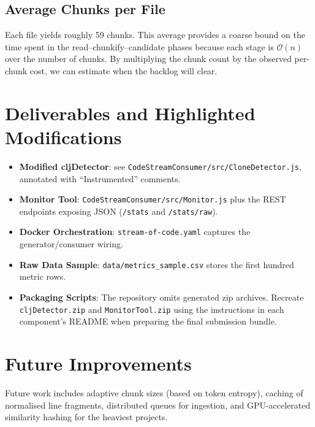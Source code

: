 \documentclass[11pt,a4paper]{article}
\begin{document}
\subsection{Average Chunks per File}
Each file yields roughly 59 chunks. This average provides a coarse bound on the time spent in the
read--chunkify--candidate phases because each stage is \(\mathcal{O}(n)\) over the number of chunks.
By multiplying the chunk count by the observed per-chunk cost, we can estimate when the backlog will
clear.

\section{Deliverables and Highlighted Modifications}
\label{sec:artefacts}
\begin{itemize}
  \item \textbf{Modified cljDetector}: see \texttt{CodeStreamConsumer/src/CloneDetector.js}, annotated
        with ``Instrumented'' comments.
  \item \textbf{Monitor Tool}: \texttt{CodeStreamConsumer/src/Monitor.js} plus the REST endpoints
        exposing JSON ({\small\texttt{/stats}} and {\small\texttt{/stats/raw}}).
  \item \textbf{Docker Orchestration}: \texttt{stream-of-code.yaml} captures the generator/consumer
        wiring.
  \item \textbf{Raw Data Sample}: \texttt{data/metrics\_sample.csv} stores the first hundred metric
        rows.
  \item \textbf{Packaging Scripts}: The repository omits generated zip archives. Recreate
        \texttt{cljDetector.zip} and \texttt{MonitorTool.zip} using the instructions in each
        component's README when preparing the final submission bundle.
\end{itemize}

\section{Future Improvements}
Future work includes adaptive chunk sizes (based on token entropy), caching of normalised line
fragments, distributed queues for ingestion, and GPU-accelerated similarity hashing for the heaviest
projects.
\end{document}
